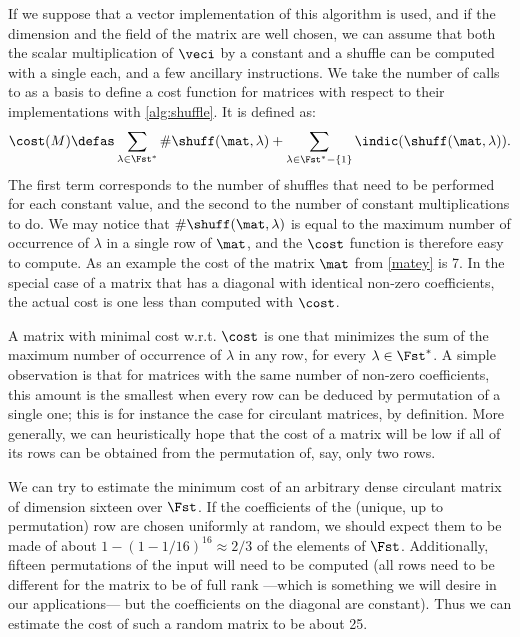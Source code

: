 If we suppose that a vector implementation of this algorithm is used, and if the dimension and the field of the matrix are well chosen,
we can assume that both the scalar multiplication of $\veci$ by a constant and a shuffle can be computed with a single
\pshufb{} each, and a few ancillary instructions. We take the number of calls to \pshufb as a basis to define a cost function for matrices with respect to their implementations with \autoref{alg:shuffle}.
It is defined as:
\[
\cost(M) \defas \sum_{\lambda \in \Fst^*}\#\shuff(\mat, \lambda) + \sum_{\lambda \in \Fst^*-\{1\}}\indic(\shuff(\mat, \lambda)).
\]
The first term corresponds to the number of shuffles that need to be performed for each constant value, and the second to the number
of constant multiplications to do.
We may notice that $\#\shuff(\mat, \lambda)$ is equal to the maximum number of occurrence of $\lambda$ in a single row of $\mat$, and the $\cost$ function
is therefore easy to compute. As an example the cost of the matrix $\mat$ from \autoref{matey} is 7. In the special case of a matrix that has a diagonal
with identical non-zero coefficients, the actual cost is one less than computed with $\cost$.

\medskip

A matrix with minimal cost w.r.t. $\cost$ is one that
minimizes the sum of the maximum number of occurrence of $\lambda$ in any row, for every $\lambda \in \Fst^*$.
A simple observation is that for matrices with the same number of non-zero coefficients, this amount is the smallest when every row can be deduced by permutation of a single one;
this is for instance the case for circulant matrices, by definition.
More generally, we can heuristically hope that the cost of a matrix will be low if all of its rows can be obtained from the permutation of, say, only two rows.

We can try to estimate the minimum cost of an arbitrary dense circulant matrix of dimension sixteen over $\Fst$.
If the coefficients of the (unique, up to permutation) row are chosen uniformly at random, we should expect them to be made of about $1-(1-1/16)^{16} \approx 2/3$ of the elements of $\Fst$.
Additionally, fifteen permutations of the input will need to be computed (all rows need to be different for the matrix to be of full rank ---which is something we will
desire in our applications--- but the coefficients on the diagonal are constant).
Thus we can estimate the cost of such a random matrix to be about 25.

